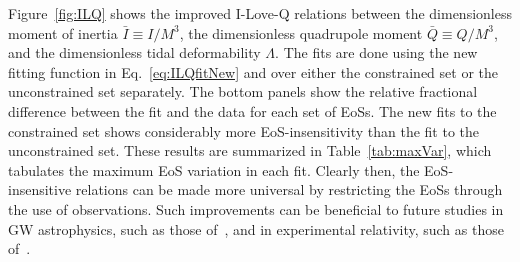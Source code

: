 \documentclass[prd,twocolumn,nofootinbib,superscriptaddress,amsmath,amssymb]{revtex4-1}
\begin{document}
Figure~\ref{fig:ILQ} shows the improved I-Love-Q relations between the dimensionless moment of inertia $\bar{I} \equiv I/M^3$, the dimensionless quadrupole moment $\bar{Q} \equiv Q/M^3$, and the dimensionless tidal deformability $\Lambda$. The fits are done using the new fitting function in Eq.~\eqref{eq:ILQfitNew} and over either the constrained set or the unconstrained set separately. The bottom panels show the relative fractional difference between the fit and the data for each set of EoSs. The new fits to the constrained set shows considerably more EoS-insensitivity than the fit to the unconstrained set. These results are summarized in Table~\ref{tab:maxVar}, which tabulates the maximum EoS variation in each fit. Clearly then, the EoS-insensitive relations can be made more universal by restricting the EoSs through the use of observations. Such improvements can be beneficial to future studies in GW astrophysics, such as those of~\cite{Kumar:2019xgp}, and in experimental relativity, such as those of~\cite{Gupta:2017vsl}. 
\end{document}

